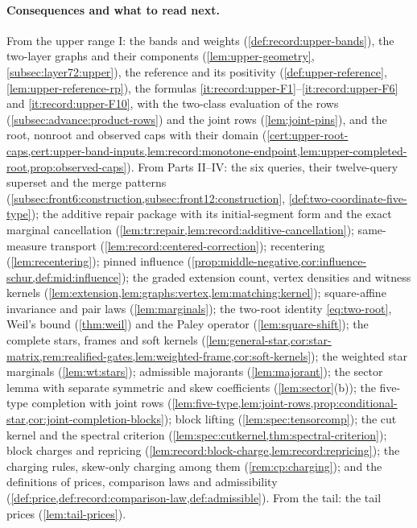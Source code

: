 \paragraph{Consequences and what to read next.}
From the upper range I: the bands and weights (\cref{def:record:upper-bands}),
the two-layer graphs and their components (\cref{lem:upper-geometry},
\cref{subsec:layer72:upper}), the reference and its positivity
(\cref{def:upper-reference}, \cref{lem:upper-reference-rp}),
the formulas \ref{it:record:upper-F1}--\ref{it:record:upper-F6} and
\ref{it:record:upper-F10}, with the two-class evaluation of the rows
(\cref{subsec:advance:product-rows}) and the joint rows (\cref{lem:joint-pins}), and
the root, nonroot and observed caps with their domain
(\cref{cert:upper-root-caps,cert:upper-band-inputs,lem:record:monotone-endpoint,lem:upper-completed-root,prop:observed-caps}).
From Parts II--IV: the six queries, their twelve-query superset and the merge
patterns (\cref{subsec:front6:construction,subsec:front12:construction},
\cref{def:two-coordinate-five-type}); the additive repair package with its
initial-segment form and the exact marginal cancellation
(\cref{lem:tr:repair,lem:record:additive-cancellation}); same-measure transport
(\cref{lem:record:centered-correction}); recentering (\cref{lem:recentering});
pinned influence (\cref{prop:middle-negative,cor:influence-schur,def:mid:influence});
the graded extension count, vertex densities and witness kernels
(\cref{lem:extension,lem:graphs:vertex,lem:matching:kernel}); square-affine invariance and pair laws
(\cref{lem:marginals}); the two-root identity \eqref{eq:two-root}, Weil's bound
(\cref{thm:weil}) and the Paley operator (\cref{lem:square-shift}); the complete
stars, frames and soft kernels
(\cref{lem:general-star,cor:star-matrix,rem:realified-gates,lem:weighted-frame,cor:soft-kernels});
the weighted star marginals (\cref{lem:wt:stars}); admissible majorants
(\cref{lem:majorant}); the sector lemma with separate symmetric and skew
coefficients (\cref{lem:sector}(b)); the five-type completion with joint rows
(\cref{lem:five-type,lem:joint-rows,prop:conditional-star,cor:joint-completion-blocks});
block lifting (\cref{lem:spec:tensorcomp}); the cut kernel and the spectral
criterion (\cref{lem:spec:cutkernel,thm:spectral-criterion}); block charges and
repricing (\cref{lem:record:block-charge,lem:record:repricing}); the charging rules,
skew-only charging among them (\cref{rem:cp:charging}); and the definitions of
prices, comparison laws and admissibility
(\cref{def:price,def:record:comparison-law,def:admissible}). From the tail: the
tail prices (\cref{lem:tail-prices}).

